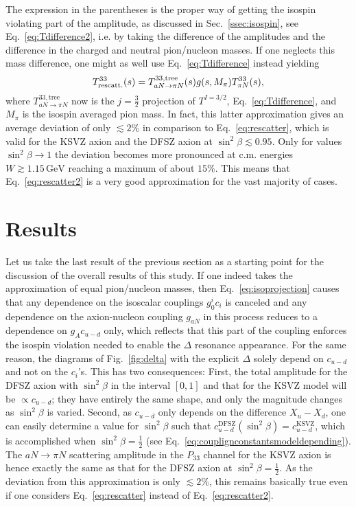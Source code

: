 \documentclass[reprint,amssymb,amsmath,floatfix,aps,prd,groupedaddress,nofootinbib]{revtex4-2}
\begin{document}
The expression in the parentheses is the proper way of getting the isospin violating part of the amplitude,
as discussed in Sec.~\ref{ssec:isospin}, see Eq.~\eqref{eq:Tdifference2}, i.e. by taking the difference
of the amplitudes and the difference in the charged and neutral pion/nucleon masses. If one neglects this mass
difference, one might as well use Eq.~\eqref{eq:Tdifference} instead yielding
\begin{equation}\label{eq:rescatter2}
T^{33}_{\rm rescatt.}(s) =T^{33,\text{tree}}_{aN\to\pi N}(s) g(s,M_{\pi}) T^{33}_{\pi N}(s),
\end{equation}
where $T^{33,\text{tree}}_{aN\to\pi N}$ now is the $j=\tfrac{3}{2}$ projection of $T^{I=3/2}$, Eq.~\eqref{eq:Tdifference},
and $M_\pi$ is the isospin averaged pion mass. In fact, this latter approximation gives an average deviation of
only $\lesssim 2\%$ in comparison to Eq.~\eqref{eq:rescatter}, which is valid for the KSVZ axion and the DFSZ axion
at $\sin^2\beta\lesssim 0.95$. Only for values $\sin^2\beta\to 1$ the deviation becomes more pronounced
at c.m. energies $W \gtrsim 1.15\,\text{GeV}$ reaching a maximum of about $15\%$. This means
that Eq.~\eqref{eq:rescatter2} is a very good approximation for the vast majority of cases.

\section{Results}\label{sec:result}

Let us take the last result of the previous section as a starting point for the discussion of the overall
results of this study. If one indeed takes the approximation of equal pion/nucleon masses, then Eq.~\eqref{eq:isoprojection}
causes that any dependence on the isoscalar couplings $g_0^i c_i$ is canceled and any dependence on the
axion-nucleon coupling $g_{aN}$ in this process reduces to a dependence on $g_A c_{u-d}$ only, which reflects that this part of the coupling enforces the isospin violation needed to enable the $\Delta$
resonance appearance. For the same reason, the diagrams of Fig.~\ref{fig:delta} with the explicit $\Delta$
solely depend on $c_{u-d}$ and not on the $c_i$'s. This has two consequences: First, the total amplitude for
the DFSZ axion with $\sin^2\beta$ in the interval $[0,1]$ and that for the KSVZ model will be $\propto c_{u-d}$; they 
have entirely the same shape, and only the magnitude changes as $\sin^2\beta$ is varied. Second, as $c_{u-d}$
only depends on the difference $X_u-X_d$, one can easily determine a value for $\sin^2\beta$ such that
$c_{u-d}^\text{DFSZ}(\sin^2\beta)=c_{u-d}^\text{KSVZ}$, which is accomplished when $\sin^2\beta=\tfrac{1}{2}$
(see Eq.~\eqref{eq:couplignconstantsmodeldepending}). The $aN\to\pi N$ scattering amplitude in the
$P_{33}$ channel for the KSVZ axion is hence exactly the same as that for the DFSZ axion at $\sin^2\beta=\tfrac{1}{2}$.
As the deviation from this approximation is only $\lesssim 2\%$, this remains basically true even if
one considers Eq.~\eqref{eq:rescatter} instead of Eq.~\eqref{eq:rescatter2}.
\end{document}
